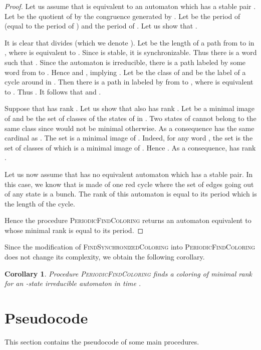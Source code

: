 \documentclass[11pt,a4paper]{article}
\newtheorem{corollary}[theorem]{Corollary}
\begin{document}
\begin{proof}


  Let us assume that  is equivalent to an automaton  which
  has a stable pair . Let  be the quotient of  by the
  congruence generated by . Let  be the period of 
  (equal to the period of ) and  the period of . 
  Let us show that .

It is clear that  divides  (which we denote ). Let
 be the length of a path from  to  in , where 
is equivalent to . Since  is stable, it is
synchronizable. Thus there is a word  such that . Since the automaton  is irreducible, there is a path
labeled by some word  from  to . Hence  and , implying .  Let 
be the class of  and  be the label of a cycle around 
in . Then there is a path in  labeled by  from  to
, where  is equivalent to . Thus . It follows that
 and .

 Suppose that  has rank .  Let us show that  also has
 rank . Let  be a minimal image of  and  be the set of
 classes of the states of  in . Two states of  cannot
 belong to the same class since  would not be minimal otherwise.
 As a consequence  has the same cardinal as . The set  is a
 minimal image of . Indeed, for any word , the set 
 is the set of classes of  which is a minimal image of
 . Hence . As a consequence,  has rank .

  Let us now assume that  has no equivalent automaton which has a
  stable pair. In this case, we know that  is made of one red
  cycle where the set of edges going out of any state is a bunch. The
  rank of this automaton is equal to its period which is the
  length of the cycle. 

  Hence the procedure \textsc{PeriodicFindColoring} returns an
  automaton equivalent to  whose minimal rank is equal to its
  period.
\end{proof}

Since the modification of \textsc{FindSynchronizedColoring} into
\textsc{PeriodicFindColoring} does not change its complexity, we
obtain the following corollary.
\begin{corollary}
Procedure \textsc{PeriodicFindColoring} finds a coloring of minimal rank
for an -state irreducible automaton in time .
\end{corollary}

\section{Pseudocode} \label{section.pseudocode}
This section contains the pseudocode of some main procedures.
\end{document}
